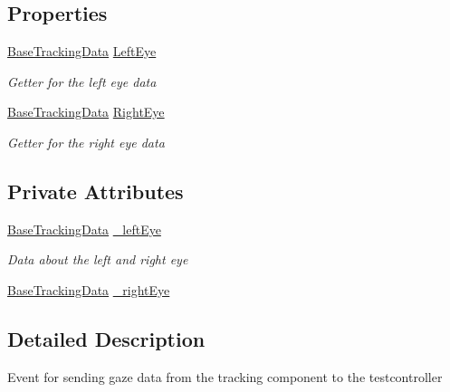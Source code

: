\subsection*{Properties}
\begin{DoxyCompactItemize}
\item 
\hyperlink{class_web_analyzer_1_1_models_1_1_base_1_1_base_tracking_data}{Base\+Tracking\+Data} \hyperlink{class_web_analyzer_1_1_events_1_1_prepare_gaze_data_event_a9da235ea57d2c7496c0ef49772f93340}{Left\+Eye}
\begin{DoxyCompactList}\small\item\em Getter for the left eye data \end{DoxyCompactList}\item 
\hyperlink{class_web_analyzer_1_1_models_1_1_base_1_1_base_tracking_data}{Base\+Tracking\+Data} \hyperlink{class_web_analyzer_1_1_events_1_1_prepare_gaze_data_event_a1ceb216d55fdabbf5372f1a600f3ecac}{Right\+Eye}
\begin{DoxyCompactList}\small\item\em Getter for the right eye data \end{DoxyCompactList}\end{DoxyCompactItemize}
\subsection*{Private Attributes}
\begin{DoxyCompactItemize}
\item 
\hyperlink{class_web_analyzer_1_1_models_1_1_base_1_1_base_tracking_data}{Base\+Tracking\+Data} \hyperlink{class_web_analyzer_1_1_events_1_1_prepare_gaze_data_event_a125f124a2790762c2fdbfae8f5f4720b}{\+\_\+left\+Eye}
\begin{DoxyCompactList}\small\item\em Data about the left and right eye \end{DoxyCompactList}\item 
\hyperlink{class_web_analyzer_1_1_models_1_1_base_1_1_base_tracking_data}{Base\+Tracking\+Data} \hyperlink{class_web_analyzer_1_1_events_1_1_prepare_gaze_data_event_a1399fd88106ee9c555156c524435406e}{\+\_\+right\+Eye}
\end{DoxyCompactItemize}


\subsection{Detailed Description}
Event for sending gaze data from the tracking component to the testcontroller 



